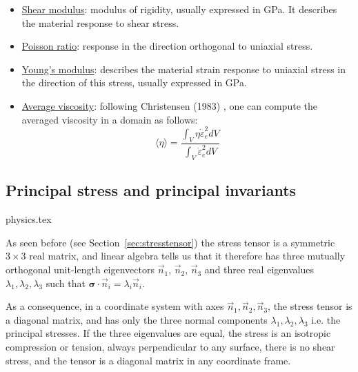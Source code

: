 \begin{itemize}
\item \underline{Shear modulus}: modulus of rigidity, usually expressed in \si{\giga\pascal}. 
It describes the material response to shear stress.

\item \underline{Poisson ratio}: response in the direction orthogonal to uniaxial stress.

\item \underline{Young's modulus}: describes the material strain response to uniaxial stress
in the direction of this stress, usually expressed in \si{\giga\pascal}.

\item \underline{Average viscosity}: following Christensen (1983) \cite{chri83b}, 
one can compute the averaged viscosity in a domain as follows:
\begin{equation}
\langle \eta \rangle = \frac{\int_V \eta \dot{\varepsilon}_e^2 dV}{\int_V  \dot{\varepsilon}_e^2 dV }
\label{eq:avrgeta}
\end{equation}


\end{itemize}




\subsection{Principal stress and principal invariants} \label{sec:princ_stress}
\begin{flushright} {\tiny {\color{gray} physics.tex}} \end{flushright}


As seen before (see Section~\ref{sec:stresstensor}) 
the stress tensor is a symmetric $3\times3$ real matrix, and linear algebra tells us that it 
therefore has three mutually orthogonal unit-length eigenvectors $\vec{n}_{1}$, $\vec{n}_{2}$, 
$\vec{n}_{3}$ and three real eigenvalues $\lambda _{1},\lambda _{2},\lambda _{3}$ 
such that ${\bm \sigma}\cdot \vec{n}_i=\lambda_{i} \vec{n}_{i}$.

As a consequence, in a coordinate system with axes $\vec{n}_{1},\vec{n}_{2},\vec{n}_{3}$, 
the stress tensor is a diagonal matrix, and has only the three normal components $\lambda _{1},\lambda _{2},\lambda _{3}$
i.e. the principal stresses. If the three eigenvalues are equal, the stress is an isotropic compression or tension, always perpendicular to any surface, there is no shear stress, and the tensor is a diagonal matrix in any coordinate frame.

